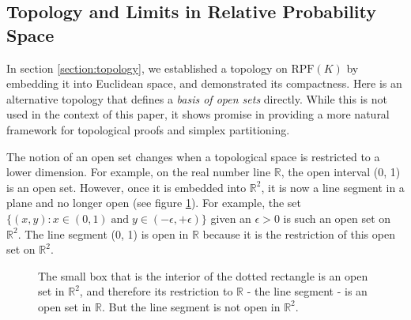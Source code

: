 \documentclass[twoside]{article}
\theoremstyle{plain}%
\theoremstyle{definition}
\theoremstyle{remark}
\begin{document}
\begin{appendices}

\section{Topology and Limits in Relative Probability Space}
\label{appedix:topology}

In section \ref{section:topology}, we established a topology on \(\text{RPF}(K)\) by embedding it into Euclidean space, and demonstrated its compactness. Here is an alternative topology that defines a \textit{basis of open sets} directly. While this is not used in the context of this paper, it shows promise in providing a more natural framework for topological proofs and simplex partitioning.

The notion of an open set changes when a topological space is restricted to a lower dimension. For example, on the real number line \(\mathbb{R}\), the open interval (0, 1) is an open set. However, once it is embedded into \(\mathbb{R}^2\), it is now a line segment in a plane and no longer open (see figure \ref{fig:sub_topology}). For example, the set \(\{(x, y): x \in (0, 1)\;  \text{and}\;  y \in (-\epsilon, +\epsilon)\}\) given an \(\epsilon > 0\) is such an open set on \(\mathbb{R}^2\). The line segment (0, 1) is open in \(\mathbb{R}\) because it is the restriction of this open set on \(\mathbb{R}^2\). 

\begin{figure}[h]
\centering
{}
\caption{The small box that is the interior of the dotted rectangle is an open set in \(\mathbb{R}^2\), and therefore its restriction to \(\mathbb{R}\) - the line segment - is an open set in \(\mathbb{R}\). But the line segment is not open in \(\mathbb{R}^2\).}
\label{fig:sub_topology}
\end{figure}


\end{appendices}
\end{document}

